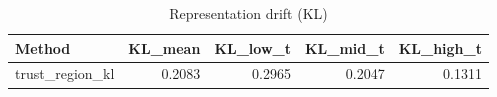 \begin{table}[htbp]
\centering
\caption{Representation drift (KL)}
\label{tab:repr-drift}
\begin{tabular}{lrrrr}
\toprule
\textbf{Method} & \textbf{KL\_mean} & \textbf{KL\_low\_t} & \textbf{KL\_mid\_t} & \textbf{KL\_high\_t} \\
\midrule
trust\_region\_kl & 0.2083 & 0.2965 & 0.2047 & 0.1311 \\
\bottomrule
\end{tabular}
\end{table}